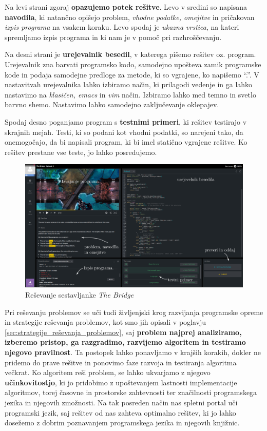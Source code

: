  Na levi strani zgoraj \textbf{opazujemo potek rešitve}. Levo v
 sredini so napisana \textbf{navodila}, ki natančno opišejo problem,
 \emph{vhodne podatke, omejitve } in pričakovan \emph{izpis programa}
 na vsakem koraku. Levo spodaj je \emph{ukazna vrstica}, na kateri
 spremljamo izpis programa in ki nam je v pomoč pri razhroščevanju.

 Na desni strani je \textbf{urejevalnik besedil}, v katerega pišemo
 rešitev oz. program. Urejevalnik zna barvati programsko kodo,
 samodejno upošteva zamik programske kode in podaja samodejne predloge
 za metode, ki so vgrajene, ko napišemo ``.''. V nastavitvah
 urejevalnika lahko izbiramo način, ki prilagodi vedenje in ga lahko
 nastavimo na \emph{klasičen, emacs} in \emph{vim} način. Izbiramo
 lahko med temno in svetlo barvno shemo. Nastavimo lahko samodejno
 zaključevanje oklepajev.

 Spodaj desno poganjamo program s \textbf{testnimi primeri}, ki
 rešitev testirajo v skrajnih mejah. Testi, ki so podani kot
 vhodni podatki, so narejeni tako, da onemogočajo, da bi napisali
 program, ki bi imel statično vgrajene rešitve. Ko rešitev prestane
 vse teste, jo lahko posredujemo. 

\begin{figure}[h!]
  \centering
    \includegraphics [width=1\linewidth, keepaspectratio =
   1] {./images/sc_web/codingame_solving-v01.jpg}
   \caption{Reševanje sestavljanke \emph{The Bridge}
     \cite{web:codingame}}
   \label{fig:web:ca:solve}
 \end{figure}

 Pri reševanju problemov se uči tudi življenjski krog razvijanja
 programske opreme in strategije reševanja problemov, kot smo jih
 opisali v poglavju \ref{sec:strategije_reševanja_problemov}, saj
 \textbf{problem najprej analiziramo, izberemo pristop, ga
   razgradimo, razvijemo algoritem in testiramo njegovo
   pravilnost}. Ta postopek lahko ponavljamo v krajših korakih, dokler
 ne pridemo do prave rešitve in ponovimo faze razvoja in testiranja
 algoritma večkrat. Ko algoritem reši problem, se lahko ukvarjamo z
 njegovo \textbf{učinkovitostjo}, ki jo pridobimo z upoštevanjem
 lastnosti implementacije algoritmov, torej časovne in prostorske
 zahtevnosti ter značilnosti programskega jezika in njegovih
 zmožnosti. Na tak posreden način nas spletni portal uči programski
 jezik, saj rešitev od nas zahteva optimalno rešitev, ki jo lahko
 dosežemo z dobrim poznavanjem programskega jezika in njegovih
 knjižnic.

